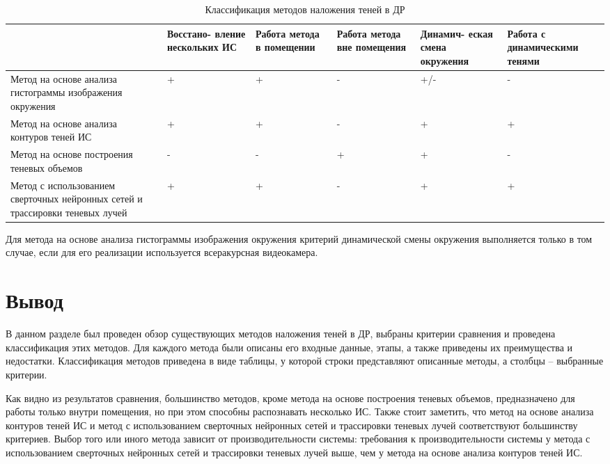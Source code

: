 \begin{table}[H]
	\caption{Классификация методов наложения теней в ДР}
	\label{class}
	\begin{center}
		\begin{tabular}{| p{4 cm} | p{2 cm} | p{2 cm} | p{2 cm} | p{2 cm} | p{2 cm} |} 
			\hline
			& Восстано- вление нескольких ИС & Работа метода в помещении & Работа метода вне помещения & Динамич- еская смена окружения & Работа с динамическими тенями \\
			\hline
			Метод на основе анализа гистограммы изображения окружения & + & + & - & +/- & - \\
			\hline
			Метод на основе анализа контуров теней ИС & + & + & - & + & + \\
			\hline
			Метод на основе построения теневых объемов & - & - & + & + & - \\
			\hline
			Метод с использованием сверточных нейронных сетей и трассировки теневых лучей & + & + & - & + & + \\
			\hline
		\end{tabular}
	\end{center}
\end{table}

Для метода на основе анализа гистограммы изображения окружения критерий динамической смены окружения выполняется только в том случае, если для его реализации используется всеракурсная видеокамера.

\section*{Вывод}

В данном разделе был проведен обзор существующих методов наложения теней в ДР, выбраны критерии сравнения и проведена классификация этих методов. Для каждого метода были описаны его входные данные, этапы, а также приведены их преимущества и недостатки. Классификация методов приведена в виде таблицы, у которой строки представляют описанные методы, а столбцы -- выбранные критерии.

Как видно из результатов сравнения, большинство методов, кроме метода на основе построения теневых объемов, предназначено для работы только внутри помещения, но при этом способны распознавать несколько ИС. Также стоит заметить, что метод на основе анализа контуров теней ИС и метод с использованием сверточных нейронных сетей и трассировки теневых лучей соответствуют большинству критериев. Выбор того или иного метода зависит от производительности системы: требования к производительности системы у метода с использованием сверточных нейронных сетей и трассировки теневых лучей выше, чем у метода на основе анализа контуров теней ИС.